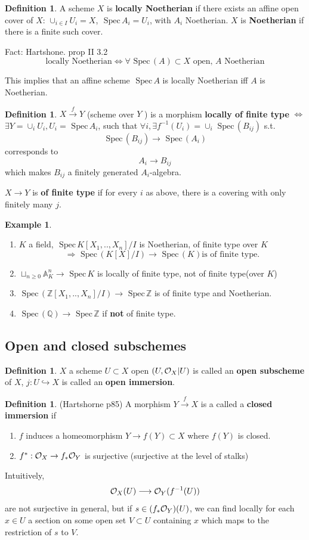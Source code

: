\documentclass[11pt]{article}
\theoremstyle{definition}
\newtheorem{dfn}[thm]{Definition}
\newtheorem{ex}[thm]{Example}
\newcommand{\spec}{\text{ Spec}\,}
\newcommand{\affn}{\mathbb A}
\newcommand{\intg}{\mathbb Z}
\newcommand{\ratl}{\mathbb Q}
\newcommand{\calo}{{\cal O}}
\newcommand{\rta}{\rightarrow}
\newcommand{\Lrta}{\Longrightarrow}
\newcommand{\lrta}{\longrightarrow}
\newcommand{\Llrta}{\Longleftrightarrow}
\newcommand{\inj}{\hookrightarrow}
\begin{document}
\begin{dfn}
A scheme $X$ is \textbf{locally Noetherian} if there exists an affine open cover of $X$:
$\cup_{i\in I} U_i=X$, $\spec A_i=U_i$, with $A_i$ Noetherian. $X$ is \textbf{Noetherian} if there is a  finite such cover.
\end{dfn}
Fact: Hartshone. prop II 3.2
$$
\text{locally Noetherian}\Llrta \forall \spec(A)\subset X \text{ open, } A \text{ Noetherian}
$$

This implies that an affine scheme $\spec A$ is locally Noetherian iff $A$ is Noetherian.

\begin{dfn}
$X\overset{f}{\lrta } Y$ (scheme over $Y$ ) is a morphism \textbf{locally of finite type} $\Llrta$ $\exists Y=\cup_i U_i, U_i=\spec A_i$, such that $\forall i, \exists f^{-1}(U_i)=\cup_i \spec(B_{ij})$ s.t.
$$
\spec(B_{ij})\lrta \spec(A_i)
$$
corresponds to 
$$
A_i\lrta B_{ij}
$$
which makes $B_{ij}$ a finitely generated $A_i$-algebra.

$X\lrta Y$ is \textbf{of finite type} if for every $i$ as above, there is a covering with only finitely many $j$.
\end{dfn}
\begin{ex}\ 
\begin{enumerate}[label=(\arabic*)]
\item $K$ a field, $\spec K[X_1,..,X_n]/I$ is Noetherian, of finite type over $K$
$$
\Lrta \spec(K[X]/I)\lrta \spec(K) \text{is of finite type}.
$$
\item $\sqcup_{n\geq 0}\affn^n_K\lrta \spec K$ is locally of finite type, not of finite type(over $K$)
\item $\spec (\intg[X_1,..,X_n]/I)\lrta\spec \intg$ is of finite type and Noetherian.
\item $\spec(\ratl)\lrta \spec \intg$ if \textbf{not} of finite type.
\end{enumerate}
\end{ex}
\subsection*{Open and closed subschemes}
\begin{dfn}
$X$ a scheme $U\subset X$ open $(U,\calo_X|U)$ is called an \textbf{open subscheme} of $X$, $j:U\inj  X$ is called an \textbf{open immersion}.
\end{dfn}
\begin{dfn}
(Hartshorne p85) A morphism $Y\overset{f}{\lrta}X$ is a called a \textbf{closed immersion} if 
\begin{enumerate}[label=(\arabic*)]
\item $f$ induces a homeomorphism $Y\lrta f(Y)\subset X$ where $f(Y)$  is closed.
\item
$f^*:\calo_X\rta f_*\calo_Y$ is surjective (surjective at the level of stalks)
\end{enumerate}
\end{dfn}
Intuitively,
$$
\calo_X(U)\lrta \calo_Y(f^{-1}(U))
$$
are not surjective  in general, but  if $s\in(f_*\calo_Y)(U)$, we can find locally  for each $x\in U$ a section  on some open set $V\subset U$ containing $x$ which maps to the restriction of $s$ to $V$.
\end{document}
